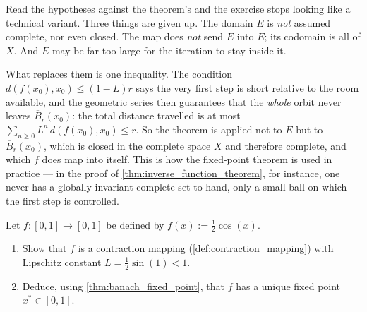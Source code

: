 \begin{remark}
\label{rem:local_banach_fixed_point}
Read the hypotheses against the theorem's and the exercise stops looking like a technical variant.
Three things are given up. The domain $E$ is \emph{not} assumed complete, nor even closed. The map
does \emph{not} send $E$ into $E$; its codomain is all of $X$. And $E$ may be far too large for
the iteration to stay inside it.

What replaces them is one inequality. The condition $d(f(x_0),x_0) \le (1-L)r$ says the very first
step is short relative to the room available, and the geometric series then guarantees that the
\emph{whole} orbit never leaves $\overline{B}_r(x_0)$: the total distance travelled is at most
$\sum_{n\ge0}L^n\,d(f(x_0),x_0) \le r$. So the theorem is applied not to $E$ but to
$\overline{B}_r(x_0)$, which is closed in the complete space $X$ and therefore complete, and which
$f$ does map into itself. This is how the fixed-point theorem is used in practice — in the proof
of \cref{thm:inverse_function_theorem}, for instance, one never has a globally invariant complete
set to hand, only a small ball on which the first step is controlled.
\end{remark}

\begin{aiexercise}
\label{ex:ai_contraction_cos}
Let $f \colon [0,1] \to [0,1]$ be defined by $f(x) := \frac{1}{2}\cos(x)$.
\begin{enumerate}[label=\textbf{(\alph*)}]
  \item Show that $f$ is a contraction mapping (\cref{def:contraction_mapping}) with Lipschitz
    constant $L = \frac{1}{2}\sin(1) < 1$.
  \item Deduce, using \cref{thm:banach_fixed_point}, that $f$ has a unique fixed point
    $x^* \in [0,1]$.
\end{enumerate}
\end{aiexercise}


